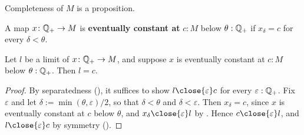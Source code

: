 \begin{lemma}
  \label{isPropIsComplete}
  Completeness of $M$ is a proposition.
\end{lemma}

\begin{definition}
  \label{isEventuallyConstantAt}
  A map $x \colon \mathbb{Q}_{+} \to M$ is \textbf{eventually constant at} $c : M$ below $\theta : \mathbb{Q}_{+}$ if $x_\delta = c$ for every $\delta < \theta$.
\end{definition}

\begin{lemma}
  \label{isLimitEventuallyEq}
  Let $l$ be a limit of $x \colon \mathbb{Q}_{+} \to M$, and suppose $x$ is eventually constant at $c : M$ below $\theta : \mathbb{Q}_{+}$. Then $l = c$.
\end{lemma}
\begin{proof}
  By separatedness (), it suffices to show $l \close{\varepsilon} c$ for every $\varepsilon : \mathbb{Q}_{+}$. Fix $\varepsilon$ and let $\delta := \min(\theta, \varepsilon) / 2$, so that $\delta < \theta$ and $\delta < \varepsilon$. Then $x_\delta = c$, since $x$ is eventually constant at $c$ below $\theta$, and $x_\delta \close{\varepsilon} l$ by . Hence $c \close{\varepsilon} l$, and $l \close{\varepsilon} c$ by symmetry ().
\end{proof}
